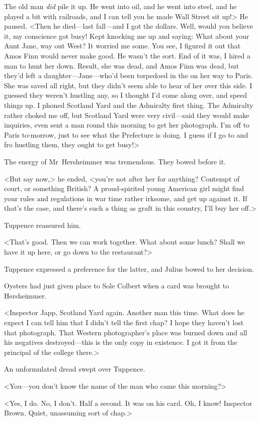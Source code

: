 The old man \emph{did} pile it up. He went into oil, and he went into steel, and he played a bit with railroads, and I can tell you he made Wall Street sit up!> He paused. <Then he died—last fall—and I got the dollars. Well, would you believe it, my conscience got busy! Kept knocking me up and saying: What about your Aunt Jane, way out West? It worried me some. You see, I figured it out that Amos Finn would never make good. He wasn't the sort. End of it was, I hired a man to hunt her down. Result, she was dead, and Amos Finn was dead, but they'd left a daughter—Jane—who'd been torpedoed in the  on her way to Paris. She was saved all right, but they didn't seem able to hear of her over this side. I guessed they weren't hustling any, so I thought I'd come along over, and speed things up. I phoned Scotland Yard and the Admiralty first thing. The Admiralty rather choked me off, but Scotland Yard were very civil—said they would make inquiries, even sent a man round this morning to get her photograph. I'm off to Paris to-morrow, just to see what the Prefecture is doing. I guess if I go to and fro hustling them, they ought to get busy!>

The energy of Mr~Hersheimmer was tremendous. They bowed before it.

<But say now,> he ended, <you're not after her for anything? Contempt of court, or something British? A proud-spirited young American girl might find your rules and regulations in war time rather irksome, and get up against it. If that's the case, and there's such a thing as graft in this country, I'll buy her off.>

Tuppence reassured him.

<That's good. Then we can work together. What about some lunch? Shall we have it up here, or go down to the restaurant?>

Tuppence expressed a preference for the latter, and Julius bowed to her decision.

Oysters had just given place to Sole Colbert when a card was brought to Hersheimmer.

<Inspector Japp,  Scotland Yard again. Another man this time. What does he expect I can tell him that I didn't tell the first chap? I hope they haven't lost that photograph. That Western photographer's place was burned down and all his negatives destroyed—this is the only copy in existence. I got it from the principal of the college there.>

An unformulated dread swept over Tuppence.

<You—you don't know the name of the man who came this morning?>

<Yes, I do. No, I don't. Half a second. It was on his card. Oh, I know! Inspector Brown. Quiet, unassuming sort of chap.> 
